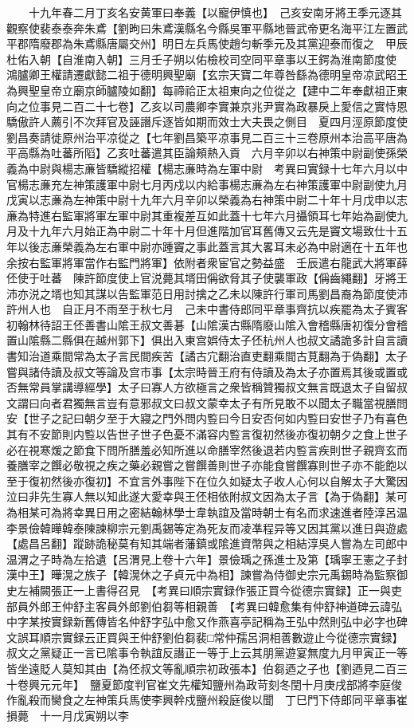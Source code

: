 　　十九年春二月丁亥名安黄軍曰奉義【以寵伊慎也】　己亥安南牙將王季元逐其觀察使裴泰泰奔朱鳶【劉昫曰朱鳶漢縣名今縣吳軍平縣地晉武帝更名海平江左置武平郡隋廢郡為朱鳶縣唐屬交州】明日左兵馬使趙匀斬季元及其黨迎泰而復之　甲辰杜佑入朝【自淮南入朝】三月壬子朔以佑檢校司空同平章事以王鍔為淮南節度使　鴻臚卿王權請遷獻懿二祖于德明興聖廟【玄宗天寶二年尊咎繇為德明皇帝凉武昭王為興聖皇帝立廟京師臚陵如翻】每禘祫正太祖東向之位從之【建中二年奉獻祖正東向之位事見二百二十七卷】乙亥以司農卿李實兼京兆尹實為政暴戾上愛信之實恃恩驕傲許人薦引不次拜官及誣譖斥逐皆如期而效士大夫畏之側目　夏四月涇原節度使劉昌奏請徙原州治平凉從之【七年劉昌築平凉事見二百三十三卷原州本治高平唐為平高縣為吐蕃所䧟】乙亥吐蕃遣其臣論頰熱入貢　六月辛卯以右神策中尉副使孫榮義為中尉與楊志亷皆驕縱招權【楊志亷時為左軍中尉　考異曰實録十七年六月以中官楊志亷充左神策護軍中尉七月丙戍以内給事楊志亷為左右神策護軍中尉副使九月戊寅以志亷為左神策中尉十九年六月辛卯以榮義為右神策中尉二十年十月戊申以志亷為特進右監軍將軍左軍中尉其重複差互如此蓋十七年六月攝領耳七年始為副使九月及十九年六月始正為中尉二十年十月但進階加官耳舊傳又云先是竇文場致仕十五年以後志亷榮義為左右軍中尉亦踵竇之事此蓋言其大畧耳未必為中尉適在十五年也　余按右監軍將軍當作右監門將軍】依附者衆宦官之勢益盛　壬辰遣右龍武大將軍薛伾使于吐蕃　陳許節度使上官涚薨其壻田偁欲脅其子使襲軍政【偁齒繩翻】牙將王沛亦涚之壻也知其謀以告監軍范日用討擒之乙未以陳許行軍司馬劉昌裔為節度使沛許州人也　自正月不雨至于秋七月　己未中書侍郎同平章事齊抗以疾罷為太子賓客　初翰林待詔王伾善書山隂王叔文善碁【山隂漢古縣隋廢山隂入會稽縣唐初復分會稽置山隂縣二縣俱在越州郭下】俱出入東宫娯侍太子伾杭州人也叔文譎詭多計自言讀書知治道乘間常為太子言民間疾苦【譎古宂翻治直吏翻乘間古莧翻為于偽翻】太子嘗與諸侍讀及叔文等論及宫市事【太宗時晉王府有侍讀及為太子亦置焉其後或置或否無常員掌講導經學】太子曰寡人方欲極言之衆皆稱贊獨叔文無言既退太子自留叔文謂曰向者君獨無言豈有意邪叔文曰叔文蒙幸太子有所見敢不以聞太子職當視膳問安【世子之記曰朝夕至于大寢之門外問内䜿曰今日安否何如内䜿曰安世子乃有喜色其有不安節則内䜿以告世子世子色憂不滿容内䜿言復初然後亦復初朝夕之食上世子必在視寒煖之節食下問所膳羞必知所進以命膳宰然後退若内䜿言疾則世子親齊玄而養膳宰之饌必敬視之疾之藥必親嘗之嘗饌善則世子亦能食嘗饌寡則世子亦不能飽以至于復初然後亦復初】不宜言外事陛下在位久如疑太子收人心何以自解太子大驚因泣曰非先生寡人無以知此遂大愛幸與王伾相依附叔文因為太子言【為于偽翻】某可為相某可為將幸異日用之密結翰林學士韋執誼及當時朝士有名而求速進者陸淳呂温李景儉韓曄韓泰陳諫柳宗元劉禹錫等定為死友而凌凖程异等又因其黨以進日與遊處【處昌呂翻】蹤跡詭秘莫有知其端者藩鎮或隂進資幣與之相結淳吳人嘗為左司郎中温渭之子時為左拾遺【呂渭見上卷十六年】景儉瑀之孫進士及第【瑀寧王憲之子封漢中王】曄滉之族子【韓滉休之子貞元中為相】諫嘗為侍御史宗元禹錫時為監察御史左補闕張正一上書得召見　【考異曰順宗實録作張正買今從德宗實録】正一與吏部員外郎王仲舒主客員外郎劉伯芻等相親善　【考異曰韓愈集有仲舒神道碑云諱弘中字某按實録新舊傳皆名仲舒字弘中愈又作燕喜亭記稱為王弘中然則弘中必字也碑文誤耳順宗實録云正買與王仲舒劉伯芻裴□常仲孺呂洞相善數遊止今從德宗實録】叔文之黨疑正一言已隂事令執誼反譖正一等于上云其朋黨遊宴無度九月甲寅正一等皆坐遠貶人莫知其由【為伾叔文等亂順宗初政張本】伯芻迺之子也【劉迺見二百三十卷興元元年】　鹽夏節度判官崔文先權知鹽州為政苛刻冬閏十月庚戌部將李庭俊作亂殺而臠食之左神策兵馬使李興幹戍鹽州殺庭俊以聞　丁巳門下侍郎同平章事崔損薨　十一月戊寅朔以李